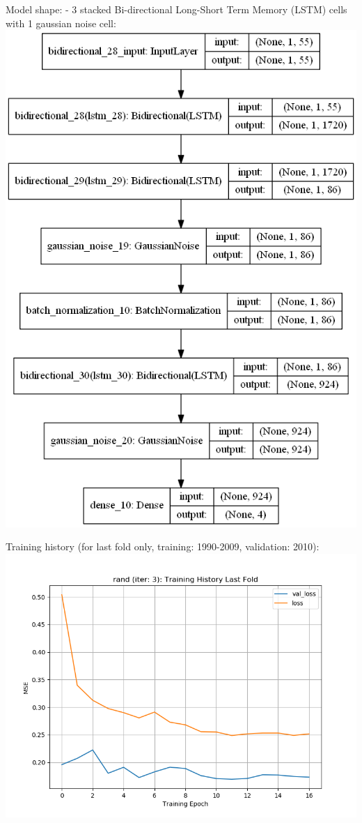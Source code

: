 \documentclass[11pt]{article}
\makeatletter
\def\maxwidth{\ifdim\Gin@nat@width>\linewidth\linewidth
    \else\Gin@nat@width\fi}
\let\Oldincludegraphics\includegraphics
\renewcommand{\includegraphics}[1]{\Oldincludegraphics[width=.8\maxwidth]{#1}}
\makeatother
\begin{document}
    Model shape: - 3 stacked Bi-directional Long-Short Term Memory (LSTM)
cells with 1 gaussian noise cell:
\includegraphics{runs/2gpuRand4stationsNarx1/foundModels/randModelIter3.png}

    Training history (for last fold only, training: 1990-2009, validation:
2010):
\includegraphics{runs/2gpuRand4stationsNarx1/foundModels/randIter3History.png}
\end{document}
